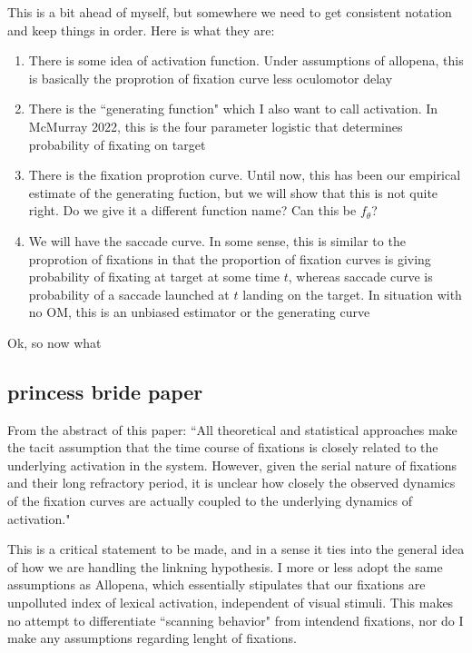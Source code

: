 \documentclass{article}
\begin{document}
This is a bit ahead of myself, but somewhere we need to get consistent notation and keep things in order. Here is what they are:

\begin{singlespace}
\begin{enumerate}
\vspace{-3mm}
\item There is some idea of activation function. Under assumptions of allopena, this is basically the proprotion of fixation curve less oculomotor delay
\item There is the ``generating function" which I also want to call activation. In McMurray 2022, this is the four parameter logistic that determines probability of fixating on target
\item There is the fixation proprotion curve. Until now, this has been our empirical estimate of the generating fuction, but we will show that this is not quite right. Do we give it a different function name? Can this be $f_{\theta}$?
\item We will have the saccade curve. In some sense, this is similar to the proprotion of fixations in that the proportion of fixation curves is giving probability of fixating at target at some time $t$, whereas saccade curve is probability of a saccade launched at $t$ landing on the target. In situation with no OM, this is an unbiased estimator or the generating curve
\end{enumerate}
\end{singlespace}

Ok, so now what

\subsection{princess bride paper}

From the abstract of this paper: ``All theoretical and statistical approaches make the tacit assumption that the time course of fixations is closely related to the underlying activation in the system. However, given the serial nature of fixations and their long refractory period, it is unclear how closely the observed dynamics of the fixation curves are actually coupled to the underlying dynamics of activation."


This is a critical statement to be made, and in a sense it ties into the general idea of how we are handling the linkning hypothesis. I more or less adopt the same assumptions as Allopena, which essentially stipulates that our fixations are unpolluted index of lexical activation, independent of visual stimuli. This makes no attempt to differentiate ``scanning behavior" from intendend fixations, nor do I make any assumptions regarding lenght of fixations.
\end{document}
